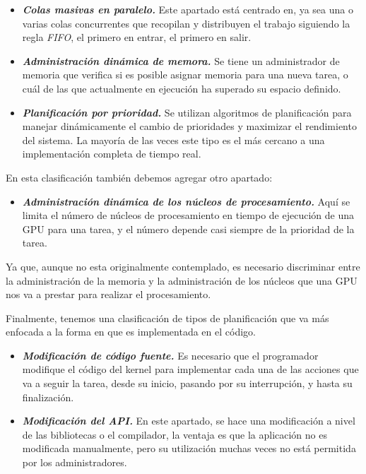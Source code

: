 \begin{itemize}

\item \textbf{\textit{Colas masivas en paralelo.}}
	Este apartado está centrado en, ya sea una o varias colas concurrentes que recopilan y distribuyen el trabajo siguiendo la regla \textit{FIFO}, el primero en entrar, el primero en salir. 
	
\item \textbf{\textit{Administración dinámica de memora.}}
	Se tiene un administrador de memoria que verifica si es posible asignar memoria para una nueva tarea, o cuál de las que actualmente en ejecución ha superado su espacio definido. 
	
\item \textbf{\textit{Planificación por prioridad.}}
	Se utilizan algoritmos de planificación para manejar dinámicamente el cambio de prioridades y maximizar el rendimiento del sistema. La mayoría de las veces este tipo es el más cercano a una implementación completa de tiempo real.
	
\end{itemize}

En esta clasificación también debemos agregar otro apartado:

\begin{itemize}

\item \textbf{\textit{Administración dinámica de los núcleos de procesamiento.}}
	Aquí se limita el número de núcleos de procesamiento en tiempo de ejecución de una GPU para una tarea, y el número depende casi siempre de la prioridad de la tarea.

\end{itemize}

Ya que, aunque no esta originalmente contemplado, es necesario discriminar entre la administración de la memoria y la administración de los núcleos que una GPU nos va a prestar para realizar el procesamiento.
    
     \vspace{0.3cm}
     
Finalmente, tenemos una clasificación de tipos de planificación que va más enfocada a la forma en que es implementada en el código.

\begin{itemize}

\item \textbf{\textit{Modificación de código fuente.}}
	Es necesario que el programador modifique el código del kernel para implementar cada una de las acciones que va a seguir la tarea, desde su inicio, pasando por su interrupción, y hasta su finalización.
	
\item \textbf{\textit{Modificación del API.}}
	En este apartado, se hace una modificación a nivel de las bibliotecas o el compilador, la ventaja es que la aplicación no es modificada manualmente, pero su utilización muchas veces no está permitida por los administradores.
	
\end{itemize}

